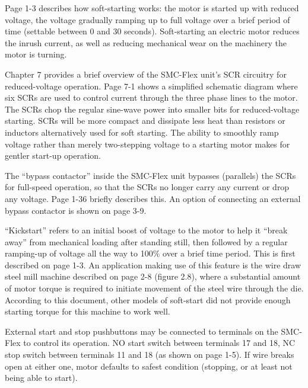 







Page 1-3 describes how soft-starting works: the motor is started up with reduced voltage, the voltage gradually ramping up to full voltage over a brief period of time (settable between 0 and 30 seconds).  Soft-starting an electric motor reduces the inrush current, as well as reducing mechanical wear on the machinery the motor is turning.

\vskip 10pt

Chapter 7 provides a brief overview of the SMC-Flex unit's SCR circuitry for reduced-voltage operation.  Page 7-1 shows a simplified schematic diagram where six SCRs are used to control current through the three phase lines to the motor.  The SCRs chop the regular sine-wave power into smaller bits for reduced-voltage starting.  SCRs will be more compact and dissipate less heat than resistors or inductors alternatively used for soft starting.  The ability to smoothly ramp voltage rather than merely two-stepping voltage to a starting motor makes for gentler start-up operation.

\vskip 10pt

The ``bypass contactor'' inside the SMC-Flex unit bypasses (parallels) the SCRs for full-speed operation, so that the SCRs no longer carry any current or drop any voltage.  Page 1-36 briefly describes this.  An option of connecting an external bypass contactor is shown on page 3-9.

\vskip 10pt

``Kickstart'' refers to an initial boost of voltage to the motor to help it ``break away'' from mechanical loading after standing still, then followed by a regular ramping-up of voltage all the way to 100\% over a brief time period.  This is first described on page 1-3.  An application making use of this feature is the wire draw steel mill machine described on page 2-8 (figure 2.8), where a substantial amount of motor torque is required to initiate movement of the steel wire through the die.  According to this document, other models of soft-start did not provide enough starting torque for this machine to work well.

\vskip 10pt

External start and stop pushbuttons may be connected to terminals on the SMC-Flex to control its operation.  NO start switch between terminals 17 and 18, NC stop switch between terminals 11 and 18 (as shown on page 1-5).  If wire breaks open at either one, motor defaults to safest condition (stopping, or at least not being able to start).












